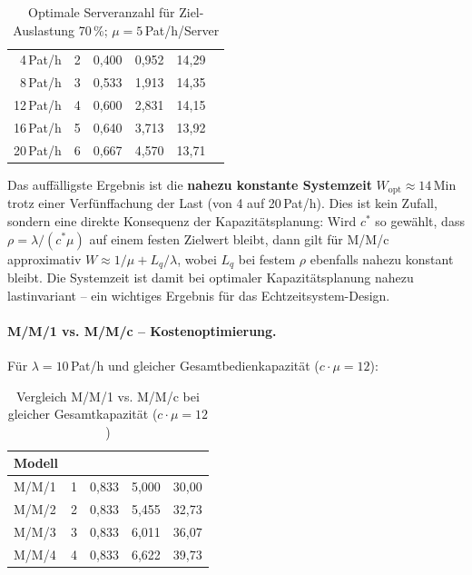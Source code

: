 ﻿\documentclass[a4paper,12pt]{scrreprt}
\theoremstyle{definition}
\begin{document}
\begin{table}[H]
	\centering
	\begin{tabular}{@{}rrrrrr@{}}
		\toprule
		\boldmath{$\lambda$} & \boldmath{$c^*$} & \boldmath{$\rho_\text{opt}$} &
		\boldmath{$L_\text{opt}$} & \boldmath{$W_\text{opt}$\,(Min)} \\
		\midrule
		4\,Pat/h & 2 & 0{,}400 &  0{,}952 & 14{,}29 \\
		8\,Pat/h & 3 & 0{,}533 &  1{,}913 & 14{,}35 \\
		12\,Pat/h & 4 & 0{,}600 &  2{,}831 & 14{,}15 \\
		16\,Pat/h & 5 & 0{,}640 &  3{,}713 & 13{,}92 \\
		20\,Pat/h & 6 & 0{,}667 &  4{,}570 & 13{,}71 \\
		\bottomrule
	\end{tabular}
	\caption{Optimale Serveranzahl für Ziel-Auslastung 70\,\%; $\mu = 5$\,Pat/h/Server}
	\label{tab:kapazitaet}
\end{table}

Das auffälligste Ergebnis ist die \textbf{nahezu konstante Systemzeit}
$W_\text{opt} \approx 14$\,Min trotz einer Verfünffachung der Last
(von 4 auf 20\,Pat/h). Dies ist kein Zufall, sondern eine direkte
Konsequenz der Kapazitätsplanung: Wird $c^*$ so gewählt, dass
$\rho = \lambda/(c^* \mu)$ auf einem festen Zielwert bleibt, dann
gilt für M/M/c approximativ $W \approx 1/\mu + L_q/\lambda$, wobei
$L_q$ bei festem $\rho$ ebenfalls nahezu konstant bleibt. Die Systemzeit
ist damit bei optimaler Kapazitätsplanung nahezu lastinvariant --
ein wichtiges Ergebnis für das Echtzeitsystem-Design.

\paragraph{M/M/1 vs. M/M/c -- Kostenoptimierung.}
Für $\lambda = 10$\,Pat/h und gleicher Gesamtbedienkapazität ($c \cdot \mu = 12$):

\begin{table}[H]
	\centering
	\begin{tabular}{@{}lrrrr@{}}
		\toprule
		\textbf{Modell} & \boldmath{$c$} & \boldmath{$\rho$} &
		\boldmath{$L$} & \boldmath{$W$ (Min)} \\
		\midrule
		M/M/1 & 1 & 0{,}833 & 5{,}000 & 30{,}00 \\
		M/M/2 & 2 & 0{,}833 & 5{,}455 & 32{,}73 \\
		M/M/3 & 3 & 0{,}833 & 6{,}011 & 36{,}07 \\
		M/M/4 & 4 & 0{,}833 & 6{,}622 & 39{,}73 \\
		\bottomrule
	\end{tabular}
	\caption{Vergleich M/M/1 vs. M/M/c bei gleicher Gesamtkapazität ($c \cdot \mu = 12$)}
	\label{tab:mmc-vergleich}
\end{table}
\end{document}
